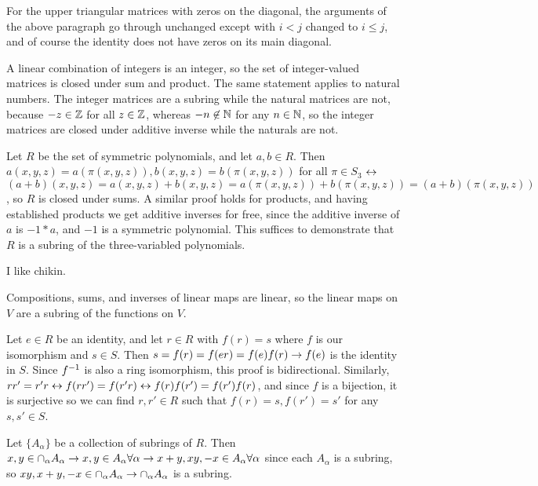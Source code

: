 \documentclass[11pt, oneside]{article}   	%
\begin{document}
For the upper triangular matrices with zeros on the diagonal, the arguments of the above paragraph go through unchanged except with $i < j$ changed to $i\le j$, and of course the identity does not have zeros on its main diagonal.
\item A linear combination of integers is an integer, so the set of integer-valued matrices is closed under sum and product. The same statement applies to natural numbers. The integer matrices are a subring while the natural matrices are not, because $-z \in \mathbb{Z}$ for all $z \in \mathbb{Z}$, whereas $-n \not \in \mathbb{N}$ for any $n \in \mathbb{N}$, so the integer matrices are closed under additive inverse while the naturals are not.
\item Let $R$ be the set of symmetric polynomials, and let $a, b \in R$. Then $a(x, y, z) = a(\pi(x, y, z)), b(x, y, z) = b(\pi(x, y, z))$ for all $\pi \in S_3$ $\leftrightarrow$ $(a + b)(x, y, z) = a(x, y, z) + b(x, y, z) = a(\pi(x, y, z)) + b(\pi(x, y, z)) = (a + b)(\pi(x, y, z))$, so $R$ is closed under sums. A similar proof holds for products, and having established products we get additive inverses for free, since the additive inverse of $a$ is $-1 * a$, and $-1$ is a symmetric polynomial. This suffices to demonstrate that $R$ is a subring of the three-variabled polynomials.
\item I like chikin.
\item Compositions, sums, and inverses of linear maps are linear, so the linear maps on $V$ are a subring of the functions on $V$.
\item Let $e \in R$ be an identity, and let $r \in R$ with $f(r) = s$ where $f$ is our isomorphism and $s \in S$. Then $s = f(r) = f(er) = f(e)f(r) \rightarrow f(e)$ is the identity in $S$. Since $f^{-1}$ is also a ring isomorphism, this proof is bidirectional. Similarly, $rr' = r'r \leftrightarrow f(rr') = f(r'r) \leftrightarrow f(r)f(r') = f(r')f(r)$, and since $f$ is a bijection, it is surjective so we can find $r, r' \in R$ such that $f(r) = s, f(r') = s'$ for any $s, s' \in S$.
\item Let $\{A_\alpha\}$ be a collection of subrings of $R$. Then $x, y \in \cap_\alpha A_\alpha \rightarrow x, y \in A_\alpha \forall \alpha \rightarrow x + y, xy, -x \in A_\alpha \forall \alpha$ since each $A_\alpha$ is a subring, so $xy, x+y, -x \in \cap_\alpha A_\alpha \rightarrow \cap_\alpha A_\alpha$ is a subring. 
\end{document}
